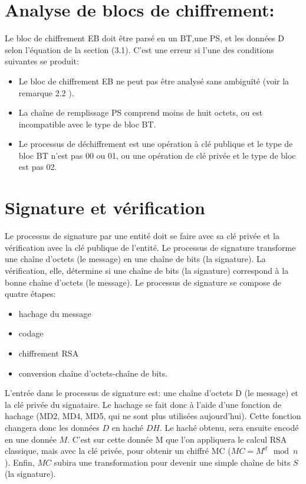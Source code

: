 \documentclass{article}
\begin{document}
\section{Analyse de blocs de chiffrement:}
Le bloc de chiffrement EB doit être parsé en un BT,une PS, et les données D selon l'équation de la section (3.1). C'est une erreur si l'une des conditions suivantes se produit:
\begin{itemize}
\item Le bloc de chiffrement EB ne peut pas être analysé
sans ambiguïté (voir la remarque 2.2 ).
\item La chaîne de remplissage PS comprend moins de huit
octets, ou est incompatible avec le type de bloc BT.
\item Le processus de déchiffrement est une opération à clé publique et le type de bloc BT n'est pas 00 ou 01, ou une opération de clé privée et le type de bloc est pas 02.
\end{itemize}
\section{Signature et vérification} 
Le processus de signature par une entité doit se faire avec sa clé privée et la vérification avec la clé publique de l'entité. 
Le processus de signature transforme une chaîne d'octets (le message) en une chaîne de bits (la signature). La vérification, elle, détermine si une chaîne de bits (la signature) correspond à la bonne chaîne d'octets (le message).
Le processus de signature se compose de quatre étapes:
\begin{itemize}
\item hachage du message
\item codage
\item chiffrement RSA
\item conversion chaîne d’octets-chaîne de bits.
\end{itemize}
L'entrée dans le processus de signature est: une chaîne d'octets D (le message) et la clé privée du signataire.
Le hachage se fait donc à l’aide d’une fonction de hachage (MD2, MD4, MD5, qui ne sont plus utilisées aujourd'hui). Cette fonction changera donc les données $D$ en haché $DH$.
Le haché obtenu, sera ensuite encodé en une donnée $M$.
C’est sur cette donnée M que l’on appliquera le calcul RSA classique, mais avec la clé privée, pour obtenir un chiffré MC ($MC = M^{d} \mod n$).
Enfin, $MC$ subira une transformation pour devenir une simple chaîne de bits $S$ (la signature).
\end{document}
